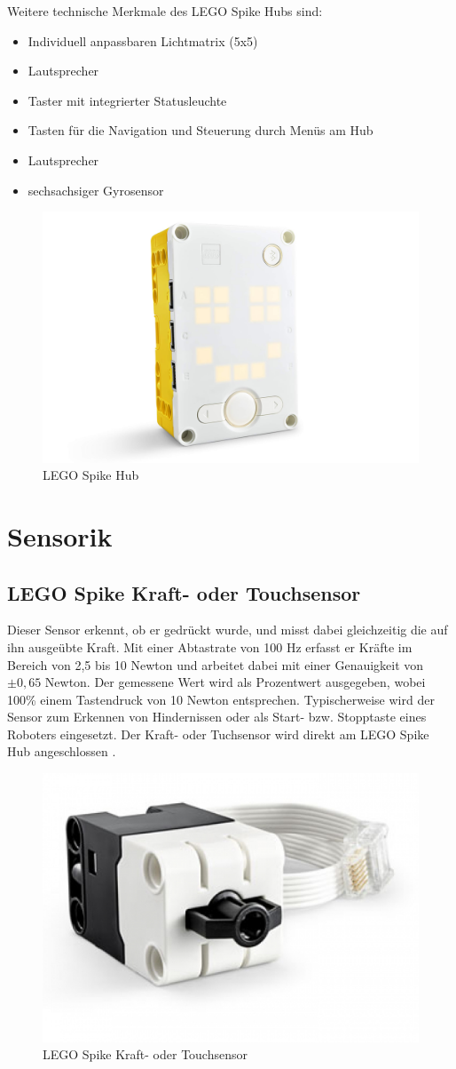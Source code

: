 Weitere technische Merkmale des LEGO Spike Hubs sind:
\begin{itemize}
	\item Individuell anpassbaren Lichtmatrix (5x5)
	\item Lautsprecher
	\item Taster mit integrierter Statusleuchte 
	\item Tasten für die Navigation und Steuerung durch Menüs am Hub 
	\item Lautsprecher
	\item sechsachsiger Gyrosensor 
\end{itemize} 

\begin{figure}[H]
	\centering
	\includegraphics[width=0.55\linewidth]{images/Hub}
	\caption[LEGO Spike Hub Quelle:\autocite{legoeducation2020spikesensors}]{LEGO Spike Hub}
	\label{fig:hub}
\end{figure}

\section{Sensorik}

\subsection{LEGO Spike Kraft- oder Touchsensor}
Dieser Sensor erkennt, ob er gedrückt wurde, und misst dabei gleichzeitig die auf ihn ausgeübte Kraft. Mit einer Abtastrate von 100 Hz erfasst er Kräfte im Bereich von 2,5 bis 10 Newton und arbeitet dabei mit einer Genauigkeit von $\pm 0,65$ Newton. Der gemessene Wert wird als Prozentwert ausgegeben, wobei 100\% einem Tastendruck von 10 Newton entsprechen. Typischerweise wird der Sensor zum Erkennen von Hindernissen oder als Start- bzw. Stopptaste eines Roboters eingesetzt. Der Kraft- oder Tuchsensor wird direkt am LEGO Spike Hub angeschlossen \autocite{legoeducation2020spikesensors}.

\begin{figure}[H]
	\centering
	\includegraphics[width=0.4\linewidth]{images/Kraftsensor}
	\caption[LEGO Spike Kraft- oder Touchsensor Quelle:\autocite{legoeducation2020spikesensors}]{LEGO Spike Kraft- oder Touchsensor}
	\label{fig:kraftsensor}
\end{figure}

